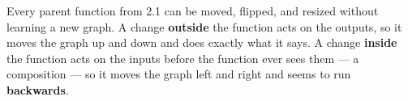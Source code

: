 \documentclass[10pt]{article}
\begin{document}
\vspace{0.14in}

\begin{remindbox}
\small
Every parent function from 2.1 can be moved, flipped, and resized without learning a new
graph. A change \textbf{outside} the function acts on the outputs, so it moves the graph up
and down and does exactly what it says. A change \textbf{inside} the function acts on the
inputs before the function ever sees them --- a composition --- so it moves the graph left
and right and seems to run \textbf{backwards}.
\end{remindbox}
\end{document}
